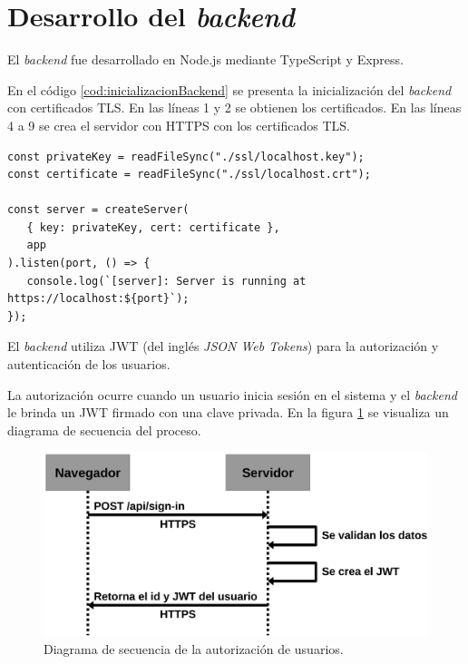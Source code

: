 \section{Desarrollo del \emph{backend}}

El \emph{backend} fue desarrollado en Node.js mediante TypeScript  y Express.

En el código \ref{cod:inicializacionBackend} se presenta la inicialización del \emph{backend} con certificados TLS. En las líneas 1 y 2 se obtienen los certificados. En las líneas 4 a 9 se crea el servidor con HTTPS con los certificados TLS.

\begin{lstlisting}[label=cod:inicializacionBackend,caption=Inicialización del \emph{backend} con TLS.]
const privateKey = readFileSync("./ssl/localhost.key");
const certificate = readFileSync("./ssl/localhost.crt");

const server = createServer(
   { key: privateKey, cert: certificate },
   app
).listen(port, () => {
   console.log(`[server]: Server is running at https://localhost:${port}`);
});
\end{lstlisting}

El \emph{backend} utiliza JWT (del inglés \textit{JSON Web Tokens}) para la autorización y autenticación de los usuarios. 

La autorización ocurre cuando un usuario inicia sesión en el sistema y el \emph{backend} le brinda un JWT firmado con una clave privada. En la figura \ref{fig:diagramaSecuenciaAutorizacionUsuarios} se visualiza un diagrama de secuencia del proceso.

\begin{figure}[H]
	\centering
	\includegraphics[width=.9\textwidth]{./Figures/Diagrama de secuencia autorizacion de usuarios.png}
	\caption{Diagrama de secuencia de la autorización de usuarios.}
	\label{fig:diagramaSecuenciaAutorizacionUsuarios}
\end{figure}

